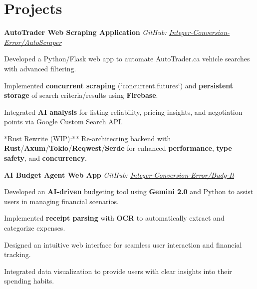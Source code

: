 \documentclass[11pt]{article}
\begin{document}
\section*{Projects}
\begin{small}

\noindent\textbf{AutoTrader Web Scraping Application} \hfill \textit{GitHub: \href{https://github.com/Integer-Conversion-Error/AutoScraper}{Integer-Conversion-Error/AutoScraper}}
\begin{compactitem}
    \item Developed a Python/Flask web app to automate AutoTrader.ca vehicle searches with advanced filtering.
    \item Implemented \textbf{concurrent scraping} (`concurrent.futures`) and \textbf{persistent storage} of search criteria/results using \textbf{Firebase}.
    \item Integrated \textbf{AI analysis} for listing reliability, pricing insights, and negotiation points via Google Custom Search API.
    \item **Rust Rewrite (WIP):** Re-architecting backend with \textbf{Rust}/\textbf{Axum}/\textbf{Tokio}/\textbf{Reqwest}/\textbf{Serde} for enhanced \textbf{performance}, \textbf{type safety}, and \textbf{concurrency}.
\end{compactitem}

\noindent\textbf{AI Budget Agent Web App} \hfill \textit{GitHub: \href{https://github.com/Integer-Conversion-Error/Budg-It}{Integer-Conversion-Error/Budg-It}}
\begin{compactitem}
    \item Developed an \textbf{AI-driven} budgeting tool using \textbf{Gemini 2.0} and Python to assist users in managing financial scenarios.
    \item Implemented \textbf{receipt parsing} with \textbf{OCR} to automatically extract and categorize expenses.
    \item Designed an intuitive web interface for seamless user interaction and financial tracking.
    \item Integrated data visualization to provide users with clear insights into their spending habits.
\end{compactitem}


\end{small}
\end{document}
